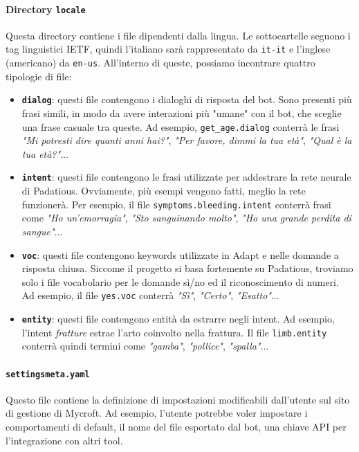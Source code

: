 \paragraph{Directory \texttt{locale}}
Questa directory contiene i file dipendenti dalla lingua. Le sottocartelle seguono i tag linguistici IETF, quindi l'italiano sarà rappresentato da \texttt{it-it} e l'inglese (americano) da \texttt{en-us}. All'interno di queste, possiamo incontrare quattro tipologie di file:
\begin{itemize}
  \item \textbf{\texttt{dialog}}: questi file contengono i dialoghi di risposta del bot. Sono presenti più frasi simili, in modo da avere interazioni più "umane" con il bot, che sceglie una frase casuale tra queste. Ad esempio, \texttt{get\_age.dialog} conterrà le frasi \textit{"Mi potresti dire quanti anni hai?"}, \textit{"Per favore, dimmi la tua età"}, \textit{"Qual è la tua età?"}...
  \item \textbf{\texttt{intent}}: questi file contengono le frasi utilizzate per addestrare la rete neurale di Padatious. Ovviamente, più esempi vengono fatti, meglio la rete funzionerà. Per esempio, il file \texttt{symptoms.bleeding.intent} conterrà frasi come \textit{"Ho un'emorragia"}, \textit{"Sto sanguinando molto"}, \textit{"Ho una grande perdita di sangue"}...
  \item \textbf{\texttt{voc}}: questi file contengono keywords utilizzate in Adapt e nelle domande a risposta chiusa. Siccome il progetto si basa fortemente su Padatious, troviamo solo i file vocabolario per le domande sì/no ed il riconoscimento di numeri. Ad esempio, il file \texttt{yes.voc} conterrà \textit{"Sì"}, \textit{"Certo"}, \textit{"Esatto"}...
  \item \textbf{\texttt{entity}}: questi file contengono entità da estrarre negli intent. Ad esempio, l'intent \textit{fratture} estrae l'arto coinvolto nella frattura. Il file \texttt{limb.entity} conterrà quindi termini come \textit{"gamba"}, \textit{"pollice"}, \textit{"spalla"}...
\end{itemize}
\paragraph{\texttt{settingsmeta.yaml}}
Questo file contiene la definizione di impostazioni modificabili dall'utente sul sito di gestione di Mycroft. Ad esempio, l'utente potrebbe voler impostare i comportamenti di default, il nome del file esportato dal bot, una chiave API per l'integrazione con altri tool.
